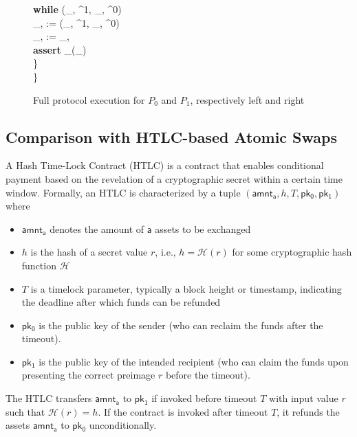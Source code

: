 \begin{figure}[H]
\begin{minipage}[t]{0.5\textwidth}
\begin{pchstack}[boxed]
{	\qquad \textbf{while} \: \not\exists \:  \in \st \mid (\pk_{, \bcb}^1, \pk_{, \bcb}^0) \in {} \\
	\qquad \tx_{, \bcb} :=  \in \st \mid (\pk_{, \bcb}^1, \pk_{, \bcb}^0) \in {} \\
	\qquad \tx_{, \bca} :=  \oplus  \tx_{, \bcb} \\
	\qquad \textbf{assert} \: _\bca(\tx_{}) \\
        \quad \} \\
        \} \\
    }
    \end{pchstack}
    \end{minipage}%
    \caption{Full protocol execution for $P_0$ and $P_1$, respectively left and right}
    \end{figure}

\subsection{Comparison with HTLC-based Atomic Swaps}

A Hash Time-Lock Contract (HTLC) is a contract that enables conditional payment based on the revelation of a cryptographic secret within a certain time window. Formally, an HTLC is characterized by a tuple  $(\mathsf{amnt_a}, h, T, \mathsf{pk_0}, \mathsf{pk_1})$ where
\begin{itemize}
	\item $\mathsf{amnt_a}$ denotes the amount of $\mathsf{a}$ assets to be exchanged
	\item $h$ is the hash of a secret value $r$, i.e., $h = \mathcal{H}(r)$ for some cryptographic hash function $\mathcal{H}$
	\item $T$ is a timelock parameter, typically a block height or timestamp, indicating the deadline after which funds can be refunded
	\item $\mathsf{pk_0}$ is the public key of the sender (who can reclaim the funds after the timeout).
	\item $\mathsf{pk_1}$ is the public key of the intended recipient (who can claim the funds upon presenting the correct preimage $r$ before the timeout).
\end{itemize}


The HTLC transfers $\mathsf{amnt_a}$ to $\mathsf{pk_1}$ if invoked before timeout $T$ with input value $r$ such that $\mathcal{H}(r) = h$. 
If the contract is invoked after timeout $T$, it refunds the assets $\mathsf{amnt_a}$ to $\mathsf{pk_0}$ unconditionally.

